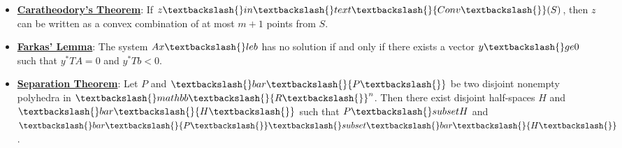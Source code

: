 \documentclass{article}%
\begin{document}
\begin{itemize}[leftmargin=*]%
\item \href{https://www.math.purdue.edu/~yipn/421/2024-10-22-Convexity.pdf#page=8}{\textbf{Caratheodory's Theorem}}: If $z \textbackslash{}in \textbackslash{}text\textbackslash{}{Conv\textbackslash{}}(S)$, then $z$ can be written as a convex combination of at most $m+1$ points from $S$.%
\item \href{https://www.math.purdue.edu/~yipn/421/2024-10-22-Convexity.pdf#page=13}{\textbf{Farkas' Lemma}}: The system $Ax \textbackslash{}le b$ has no solution if and only if there exists a vector $y \textbackslash{}ge 0$ such that $y^*T A = 0$ and $y^*T b < 0$.%
\item \href{https://www.math.purdue.edu/~yipn/421/2024-10-22-Convexity.pdf#page=10}{\textbf{Separation Theorem}}: Let $P$ and $\textbackslash{}bar\textbackslash{}{P\textbackslash{}}$ be two disjoint nonempty polyhedra in $\textbackslash{}mathbb\textbackslash{}{R\textbackslash{}}^n$. Then there exist disjoint half-spaces $H$ and $\textbackslash{}bar\textbackslash{}{H\textbackslash{}}$ such that $P \textbackslash{}subset H$ and $\textbackslash{}bar\textbackslash{}{P\textbackslash{}} \textbackslash{}subset \textbackslash{}bar\textbackslash{}{H\textbackslash{}}$.%
\end{itemize}%
\end{document}
